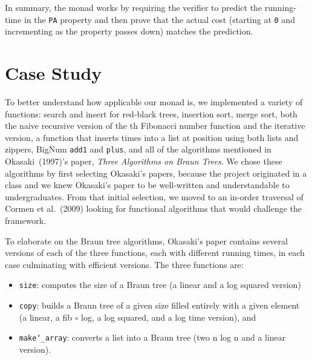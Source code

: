 \documentclass{llncs}
\newcommand{\sectionNewpage}{}
\newcommand{\Scribtexttt}[1]{{\texttt{#1}}}
\newlength{\stabLeft}
\newcommand{\atItemizeStart}[0]{\addtolength{\stabLeft}{\labelsep}
                                \addtolength{\stabLeft}{\labelwidth}}
\let\SOriginalthesubsection\thesubsection
\newcommand{\Ssection}[2]{\section[#1]{#2}\let\thesubsection\SOriginalthesubsection}
\begin{document}
In summary, the monad works by requiring the verifier to predict the
running{-}time in the \Scribtexttt{PA} property and then prove that the actual
cost (starting at \Scribtexttt{0} and incrementing as the property passes down)
matches the prediction.

\sectionNewpage

\Ssection{Case Study}{Case Study}\label{t:x28part_x22secx3acasex2dstudyx22x29}

To better understand how applicable our monad is, we implemented a
variety of functions: search and insert for red{-}black trees, insertion
sort, merge sort, both the naive recursive version of the
th Fibonacci number function and the iterative version,
a function that inserts  times into a list at position
 using both lists and zippers, BigNum \Scribtexttt{add1} and
\Scribtexttt{plus}, and all of the algorithms mentioned in
Okasaki~(1997){'}s paper, \textit{Three
Algorithms on Braun Trees}. We chose these algorithms by first
selecting Okasaki{'}s papers, because the project originated in a class
and we knew Okasaki{'}s paper to be well{-}written and understandable to
undergraduates. From that initial selection, we moved to an in{-}order
traversal of Cormen et al.~(2009) looking for functional algorithms that would
challenge the framework.

To elaborate on the Braun tree algorithms, Okasaki{'}s paper contains
several versions of each of the three functions, each with different
running times, in each case culminating with efficient versions.  The
three functions are:


\noindent \begin{itemize}\atItemizeStart

\item \Scribtexttt{size}: computes the size of a Braun
tree (a linear and a log squared version)

\item \Scribtexttt{copy}: builds a Braun tree of a given size
filled entirely with a given element
(a linear, a fib $\circ$ log, a log squared, and a log time version),
and

\item \Scribtexttt{make{\char`\_}array}: converts a list into a Braun tree
(two n log n and a linear version).\end{itemize}
\end{document}
